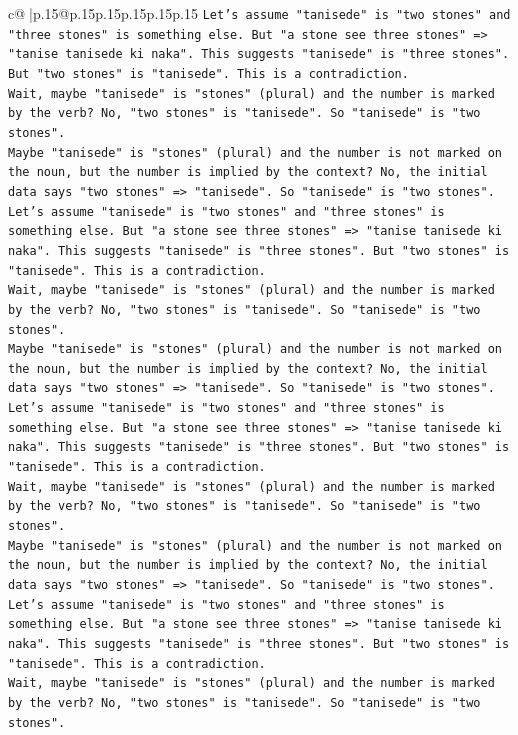 \documentclass{article}
\begin{document}
{\begin{supertabular}{c@{$\;$}|p{.15\linewidth}@{}p{.15\linewidth}p{.15\linewidth}p{.15\linewidth}p{.15\linewidth}p{.15\linewidth}}
{{{\texttt{Let's assume "tanisede" is "two stones" and "three stones" is something else. But "a stone see three stones" => "tanise tanisede ki naka". This suggests "tanisede" is "three stones". But "two stones" is "tanisede". This is a contradiction.} \\
\texttt{Wait, maybe "tanisede" is "stones" (plural) and the number is marked by the verb? No, "two stones" is "tanisede". So "tanisede" is "two stones".} \\
\texttt{Maybe "tanisede" is "stones" (plural) and the number is not marked on the noun, but the number is implied by the context? No, the initial data says "two stones" => "tanisede". So "tanisede" is "two stones".} \\
\texttt{Let's assume "tanisede" is "two stones" and "three stones" is something else. But "a stone see three stones" => "tanise tanisede ki naka". This suggests "tanisede" is "three stones". But "two stones" is "tanisede". This is a contradiction.} \\
\texttt{Wait, maybe "tanisede" is "stones" (plural) and the number is marked by the verb? No, "two stones" is "tanisede". So "tanisede" is "two stones".} \\
\texttt{Maybe "tanisede" is "stones" (plural) and the number is not marked on the noun, but the number is implied by the context? No, the initial data says "two stones" => "tanisede". So "tanisede" is "two stones".} \\
\texttt{Let's assume "tanisede" is "two stones" and "three stones" is something else. But "a stone see three stones" => "tanise tanisede ki naka". This suggests "tanisede" is "three stones". But "two stones" is "tanisede". This is a contradiction.} \\
\texttt{Wait, maybe "tanisede" is "stones" (plural) and the number is marked by the verb? No, "two stones" is "tanisede". So "tanisede" is "two stones".} \\
\texttt{Maybe "tanisede" is "stones" (plural) and the number is not marked on the noun, but the number is implied by the context? No, the initial data says "two stones" => "tanisede". So "tanisede" is "two stones".} \\
\texttt{Let's assume "tanisede" is "two stones" and "three stones" is something else. But "a stone see three stones" => "tanise tanisede ki naka". This suggests "tanisede" is "three stones". But "two stones" is "tanisede". This is a contradiction.} \\
\texttt{Wait, maybe "tanisede" is "stones" (plural) and the number is marked by the verb? No, "two stones" is "tanisede". So "tanisede" is "two stones".} \\
}}}
\end{supertabular}}
\end{document}
